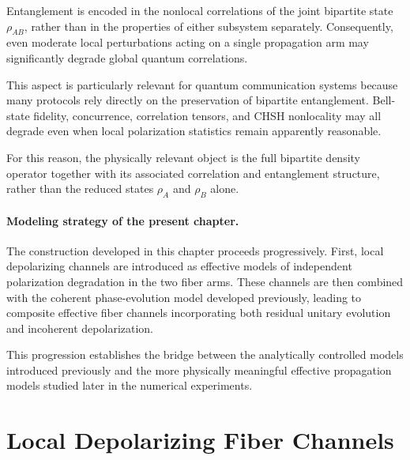 Entanglement is encoded in the nonlocal correlations of the joint bipartite state \( \rho_{AB} \), rather than in the properties of either subsystem separately. Consequently, even moderate local perturbations acting on a single propagation arm may significantly degrade global quantum correlations.

\medskip

This aspect is particularly relevant for quantum communication systems because many protocols rely directly on the preservation of bipartite entanglement. Bell-state fidelity, concurrence, correlation tensors, and CHSH nonlocality may all degrade even when local polarization statistics remain apparently reasonable.

\medskip

For this reason, the physically relevant object is the full bipartite density operator together with its associated correlation and entanglement structure, rather than the reduced states \( \rho_A \) and \( \rho_B \) alone.

\medskip

\paragraph{Modeling strategy of the present chapter.}

The construction developed in this chapter proceeds progressively. First, local depolarizing channels are introduced as effective models of independent polarization degradation in the two fiber arms. These channels are then combined with the coherent phase-evolution model developed previously, leading to composite effective fiber channels incorporating both residual unitary evolution and incoherent depolarization.

\medskip

This progression establishes the bridge between the analytically controlled models introduced previously and the more physically meaningful effective propagation models studied later in the numerical experiments.


\section{Local Depolarizing Fiber Channels}
\label{sec:local_depolarizing_fiber_channels}

